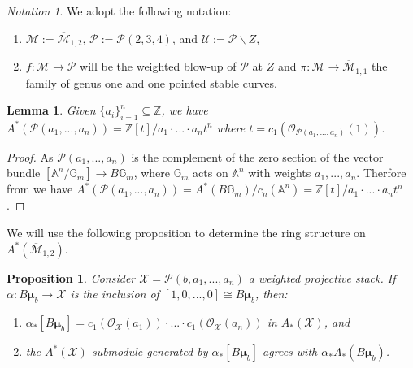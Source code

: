 \documentclass[11pt]{amsart}
\newtheorem{lemma}[theorem]{Lemma}
\newtheorem{prop}[theorem]{Proposition}
\theoremstyle{definition}
\theoremstyle{remark}
\newtheorem{notation}{Notation}
\newcommand{\calO}{\mathcal O}
\newcommand{\calM}{\mathcal M}
\newcommand{\calU}{\mathcal U}
\newcommand{\calX}{\mathcal X}
\newcommand{\calP}{\mathcal P}
\newcommand{\bmu}{\boldsymbol{\mu}}
\newcommand{\bG}{\mathbb{G}}
\begin{document}
\begin{notation}We adopt the following notation:
\begin{enumerate}
    \item $\calM:=\overline{\calM}_{1,2}$, $\calP:= \calP(2,3,4)$,
    and $\calU:=\calP\smallsetminus Z$,
    \item $f:\calM \to \calP$ will be the weighted blow-up of $\calP$ at $Z$ and $\pi:\calM \to \overline{\calM}_{1,1}$ the family of genus one and one pointed stable curves.
\end{enumerate}
\end{notation}

\begin{lemma}\label{lemma_chow_ring_weighted_proj_space}
Given $\{a_i\}_{i=1}^n \subseteq\mathbb{Z}$, we have $A^*(\calP(a_1,...,a_n)) = \mathbb{Z}[t]/a_1\cdot...\cdot a_nt^n$ where $t=c_1(\calO_{\calP(a_1,...,a_n)}(1))$.
\end{lemma}
\begin{proof}
As $\calP(a_1,...,a_n)$ is the complement of the zero section of the vector bundle $[\mathbb{A}^n/\bG_m]\to B\bG_m$, where $\mathbb{G}_m$ acts on $\mathbb{A}^n$ with weights $a_1,...,a_n$. Therfore from \cite[Lemma 2.2]{MV06} we have $A^*(\calP(a_1,...,a_n)) = A^*(B\bG_m)/c_n(\mathbb{A}^n) = \mathbb{Z}[t]/a_1\cdot...\cdot a_nt^n$. 
\end{proof}
We will use the following proposition to determine the ring structure on $A^*(\overline{\calM}_{1,2})$.
\begin{prop}\label{prop_inclusion_of_a_pt_with_some_coordinates_0_in_weighted_proj_stack}Consider $\calX = \calP(b, a_1,...,a_n)$ a weighted projective stack. If $\alpha:B\bmu_{b}\to \calX$ is the inclusion of  $[1,0,...,0]\cong B\bmu_{b}$, then:
\begin{enumerate}
    \item $\alpha_*[B\bmu_{b}] = c_1(\calO_\calX(a_1))\cdot ... \cdot c_1(\calO_\calX(a_n))$ in $A_*(\calX)$, and
    \item the $A^*(\calX)$-submodule generated by $\alpha_*[B\bmu_{b}]$ agrees with $\alpha_*A_*(B\bmu_{b})$.
\end{enumerate}
\end{prop}
\end{document}
